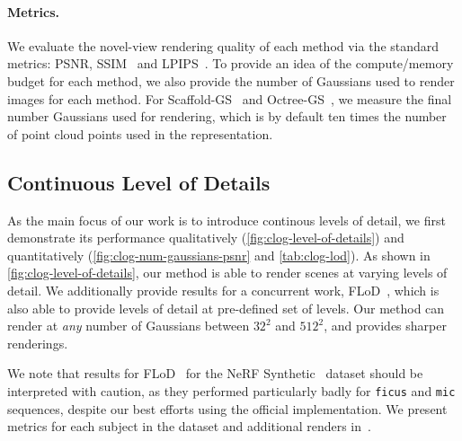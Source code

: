 
      
      
      
    \paragraph{Metrics.}
      We evaluate the novel-view rendering quality of each method via the
      standard metrics: PSNR, SSIM~\cite{wang2004image} and
      LPIPS~\cite{zhang2018perceptual}.
      To provide an idea of the compute/memory budget for each method, we also
      provide the number of Gaussians used to render images for each method.
      For Scaffold-GS~\cite{lu2024scaffold} and
      Octree-GS~\cite{ren2024octree}, we measure the final number Gaussians
      used for rendering, which is by default ten times the number of point
      cloud points used in the representation.


  \subsection{Continuous Level of Details}

    As the main focus of our work is to introduce continous levels of detail,
    we first demonstrate its performance qualitatively
    (\cref{fig:clog-level-of-details}) and quantitatively
    (\cref{fig:clog-num-gaussians-psnr} and \cref{tab:clog-lod}).
    As shown in \cref{fig:clog-level-of-details}, our method is able to render
    scenes at varying levels of detail.
    We additionally provide results for a concurrent work,
    FLoD~\cite{seo2024flod}, which is also able to provide levels of detail at
    pre-defined set of levels.
    Our method can render at \emph{any} number of Gaussians between $32^2$ and
    $512^2$, and provides sharper renderings.

    We note that results for FLoD~\cite{seo2024flod} for the NeRF
    Synthetic~\cite{mildenhall2020nerf} dataset should be interpreted with
    caution, as they performed particularly badly for \texttt{ficus} and
    \texttt{mic} sequences, despite our best efforts using the official
    implementation.
    We present metrics for each subject in the dataset and additional renders
    in~\supplementary{}.

